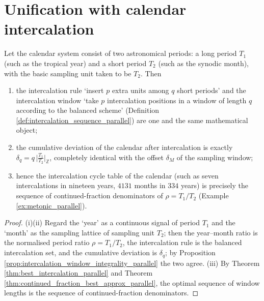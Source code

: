 \section{Unification with calendar intercalation}\label{sec:calendar_unification}

\begin{theorem}\label{thm:calendar_sampling_unification_parallel}
Let the calendar system consist of two astronomical periods: a long period $T_1$ (such as the tropical year) and a short period $T_2$ (such as the synodic month), with the basic sampling unit taken to be $T_2$. Then
\begin{enumerate}[label=(\roman*)]
    \item the intercalation rule `insert $p$ extra units among $q$ short periods' and the intercalation window `take $p$ intercalation positions in a window of length $q$ according to the balanced scheme' (Definition \ref{def:intercalation_sequence_parallel}) are one and the same mathematical object;
    \item the cumulative deviation of the calendar after intercalation is exactly $\delta_q=q\,\big|\frac{T_1}{T_2}\big|_{\mathbb{Z}}$, completely identical with the offset $\delta_M$ of the sampling window;
    \item hence the intercalation cycle table of the calendar (such as seven intercalations in nineteen years, $4131$ months in $334$ years) is precisely the sequence of continued-fraction denominators of $\rho=T_1/T_2$ (Example \ref{ex:metonic_parallel}).
\end{enumerate}
\end{theorem}

\begin{proof}
(i)(ii) Regard the `year' as a continuous signal of period $T_1$ and the `month' as the sampling lattice of sampling unit $T_2$; then the year--month ratio is the normalised period ratio $\rho=T_1/T_2$, the intercalation rule is the balanced intercalation set, and the cumulative deviation is $\delta_q$; by Proposition \ref{prop:intercalation_window_integrality_parallel} the two agree. (iii) By Theorem \ref{thm:best_intercalation_parallel} and Theorem \ref{thm:continued_fraction_best_approx_parallel}, the optimal sequence of window lengths is the sequence of continued-fraction denominators.
\end{proof}

